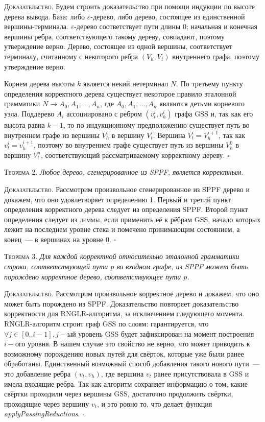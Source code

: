 \textsc{Доказательство.}
Будем строить доказательство при помощи индукции по высоте дерева вывода. База: либо 
$\varepsilon$-дерево, либо дерево, состоящее из единственной вершины-терминала. 
$\varepsilon$-дерево соответствует пути длины $0$; начальная и конечная вершины 
ребра, соответствующего такому дереву, совпадают, поэтому утверждение верно. 
Дерево, состоящее из одной вершины, соответствует терминалу, считанному с 
некоторого ребра $(V_{h}, V_{t})$ внутреннего графа, поэтому утверждение верно.

Корнем дерева высоты $k$ является некий нетерминал $N$. По третьему пункту 
определения корректного дерева существует некоторое правило эталонной 
грамматики $N \rightarrow A_{0}, A_{1}, \dots, A_{n}$, где $A_{0}, A_{1}, 
\dots, A_{n}$ являются детьми корневого узла. Поддерево $A_{i}$ 
ассоциировано с ребром $(v_{t}^{i}, v_{h}^{i})$ графа GSS и, так как его 
высота равна $k-1$, то по индукционному предположению существует путь во 
внутреннем графе из вершины $V_{h}^{i}$ в вершину $V_{t}^{i}$. Вершина 
$V_{t}^{i} = V_{h}^{i+1}$, так как $v_{t}^{i} = v_{h}^{i+1}$, поэтому во 
внутреннем графе существует путь из вершины $V_{h}^{0}$ в вершину 
$V_{t}^{n}$, соответствующий рассматриваемому корректному дереву. $\square$

\textsc{Теорема 2.} 
\textit{Любое дерево, сгенерированное из SPPF, является корректным.}

\textsc{Доказательство.}
Рассмотрим произвольное сгенерированное из SPPF дерево и докажем, что оно 
удовлетворяет определению 1. Первый и третий пункт определения корректного дерева следует из определения SPPF. Второй пункт определения следует из \textsc{леммы}, если применить её к рёбрам GSS, начало которых лежит на последнем уровне стека и помечено принимающим состоянием, а конец~--- в вершинах на уровне 0. $\square$

\textsc{Теорема 3.} 
\textit{Для каждой корректной относительно эталонной грамматики строки, соответствующей пути $p$ во входном графе, из SPPF может быть порождено корректное дерево, соответствующее пути $p$.}

\textsc{Доказательство.}
Рассмотрим произвольное корректное дерево и докажем, что оно может быть порождено из SPPF. Доказательство повторяет доказательство корректности для RNGLR-алгоритма, за исключением следующего момента. RNGLR-алгоритм строит граф GSS по слоям: гарантируется, что $\forall j \in [0..i-1], j-$ый уровень GSS будет зафиксирован на момент построения $i-$ого уровня. В нашем случае это свойство не верно, что может приводить к возможному порождению новых путей для свёрток, которые уже были ранее обработаны. Единственный возможный способ добавления такого нового пути~--- это добавление ребра $(v_{t}, v_{h})$, где вершина $v_{t}$ ранее присутствовала в GSS и имела входящие ребра. Так как алгоритм сохраняет информацию о том, какие свёртки проходили через вершины GSS, достаточно продолжить свёртки, проходящие через вершину $v_{t}$, и это ровно то, что делает функция \emph{applyPassingReductions}. $\square$

